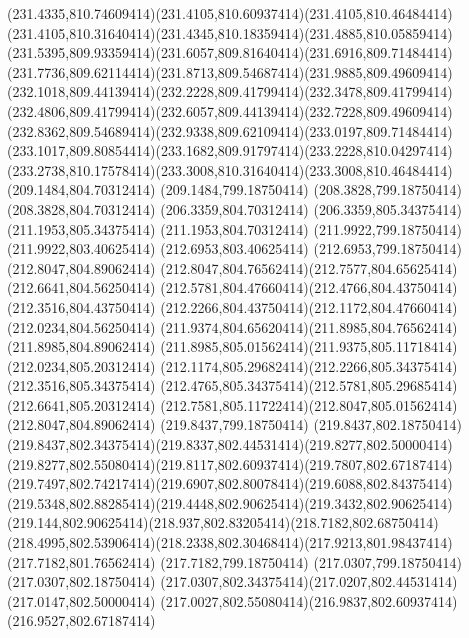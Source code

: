{{	\curveto(231.4335,810.74609414)(231.4105,810.60937414)(231.4105,810.46484414)
	\curveto(231.4105,810.31640414)(231.4345,810.18359414)(231.4885,810.05859414)
	\curveto(231.5395,809.93359414)(231.6057,809.81640414)(231.6916,809.71484414)
	\curveto(231.7736,809.62114414)(231.8713,809.54687414)(231.9885,809.49609414)
	\curveto(232.1018,809.44139414)(232.2228,809.41799414)(232.3478,809.41799414)
	\curveto(232.4806,809.41799414)(232.6057,809.44139414)(232.7228,809.49609414)
	\curveto(232.8362,809.54689414)(232.9338,809.62109414)(233.0197,809.71484414)
	\curveto(233.1017,809.80854414)(233.1682,809.91797414)(233.2228,810.04297414)
	\curveto(233.2738,810.17578414)(233.3008,810.31640414)(233.3008,810.46484414)
	\closepath
	\moveto(209.1484,804.70312414)
	\lineto(209.1484,799.18750414)
	\lineto(208.3828,799.18750414)
	\lineto(208.3828,804.70312414)
	\lineto(206.3359,804.70312414)
	\lineto(206.3359,805.34375414)
	\lineto(211.1953,805.34375414)
	\lineto(211.1953,804.70312414)
	\closepath
	\moveto(211.9922,799.18750414)
	\lineto(211.9922,803.40625414)
	\lineto(212.6953,803.40625414)
	\lineto(212.6953,799.18750414)
	\closepath
	\moveto(212.8047,804.89062414)
	\curveto(212.8047,804.76562414)(212.7577,804.65625414)(212.6641,804.56250414)
	\curveto(212.5781,804.47660414)(212.4766,804.43750414)(212.3516,804.43750414)
	\curveto(212.2266,804.43750414)(212.1172,804.47660414)(212.0234,804.56250414)
	\curveto(211.9374,804.65620414)(211.8985,804.76562414)(211.8985,804.89062414)
	\curveto(211.8985,805.01562414)(211.9375,805.11718414)(212.0234,805.20312414)
	\curveto(212.1174,805.29682414)(212.2266,805.34375414)(212.3516,805.34375414)
	\curveto(212.4765,805.34375414)(212.5781,805.29685414)(212.6641,805.20312414)
	\curveto(212.7581,805.11722414)(212.8047,805.01562414)(212.8047,804.89062414)
	\closepath
	\moveto(219.8437,799.18750414)
	\lineto(219.8437,802.18750414)
	\curveto(219.8437,802.34375414)(219.8337,802.44531414)(219.8277,802.50000414)
	\curveto(219.8277,802.55080414)(219.8117,802.60937414)(219.7807,802.67187414)
	\curveto(219.7497,802.74217414)(219.6907,802.80078414)(219.6088,802.84375414)
	\curveto(219.5348,802.88285414)(219.4448,802.90625414)(219.3432,802.90625414)
	\curveto(219.144,802.90625414)(218.937,802.83205414)(218.7182,802.68750414)
	\curveto(218.4995,802.53906414)(218.2338,802.30468414)(217.9213,801.98437414)
	\lineto(217.7182,801.76562414)
	\lineto(217.7182,799.18750414)
	\lineto(217.0307,799.18750414)
	\lineto(217.0307,802.18750414)
	\curveto(217.0307,802.34375414)(217.0207,802.44531414)(217.0147,802.50000414)
	\curveto(217.0027,802.55080414)(216.9837,802.60937414)(216.9527,802.67187414)
}}
